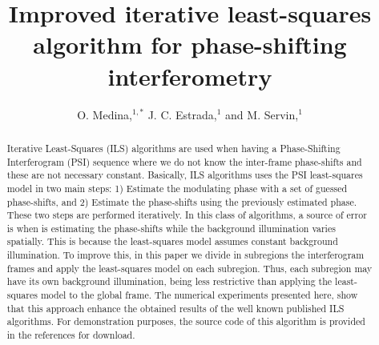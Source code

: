 \documentclass[letterpaper,12pt]{article}   %
\begin{document}
\title{Improved iterative least-squares algorithm for phase-shifting
  interferometry}

\author{O. Medina,$^{1,*}$ J. C. Estrada,$^{1}$ and M. Servin,$^{1}$}

\address{$^1$Centro de Investigaciones en Optica A. C., Loma del
  bosque 115, Col. Lomas del Campestre, Leon Guanajuato, 37150,
  Mexico}

\address{$^*$Corresponding author: orlandomedina@cio.mx}

\maketitle

\begin{abstract}
  Iterative Least-Squares (ILS) algorithms are used when having a
  Phase-Shifting Interferogram (PSI) sequence where we do not know the
  inter-frame phase-shifts and these are not necessary
  constant. Basically, ILS algorithms uses the PSI least-squares model
  in two main steps: 1) Estimate the modulating phase with a set of
  guessed phase-shifts, and 2) Estimate the phase-shifts using the
  previously estimated phase. These two steps are performed
  iteratively. In this class of algorithms, a source of error is when
  is estimating the phase-shifts while the background illumination
  varies spatially. This is because the least-squares model assumes
  constant background illumination. To improve this, in this paper we
  divide in subregions the interferogram frames and apply the
  least-squares model on each subregion. Thus, each subregion may have
  its own background illumination, being less restrictive than
  applying the least-squares model to the global frame. The numerical
  experiments presented here, show that this approach enhance the
  obtained results of the well known published ILS algorithms. For
  demonstration purposes, the source code of this algorithm is
  provided in the references for download.
\end{abstract}
\end{document}
